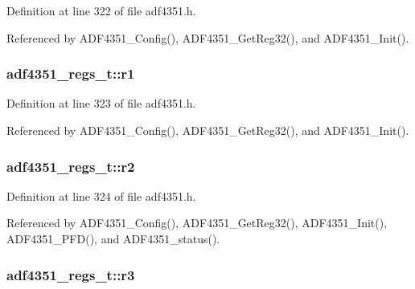 Definition at line 322 of file adf4351.\+h.



Referenced by A\+D\+F4351\+\_\+\+Config(), A\+D\+F4351\+\_\+\+Get\+Reg32(), and A\+D\+F4351\+\_\+\+Init().

\subsubsection[{\texorpdfstring{r1}{r1}}]{ adf4351\+\_\+regs\+\_\+t\+::r1}\hypertarget{structadf4351__regs__t_a9e35aa252797cdae6d46ae0daad2bc40}{}\label{structadf4351__regs__t_a9e35aa252797cdae6d46ae0daad2bc40}


Definition at line 323 of file adf4351.\+h.



Referenced by A\+D\+F4351\+\_\+\+Config(), A\+D\+F4351\+\_\+\+Get\+Reg32(), and A\+D\+F4351\+\_\+\+Init().

\subsubsection[{\texorpdfstring{r2}{r2}}]{ adf4351\+\_\+regs\+\_\+t\+::r2}\hypertarget{structadf4351__regs__t_af6667dbbd7434e0394cc9f569d3e24bb}{}\label{structadf4351__regs__t_af6667dbbd7434e0394cc9f569d3e24bb}


Definition at line 324 of file adf4351.\+h.



Referenced by A\+D\+F4351\+\_\+\+Config(), A\+D\+F4351\+\_\+\+Get\+Reg32(), A\+D\+F4351\+\_\+\+Init(), A\+D\+F4351\+\_\+\+P\+F\+D(), and A\+D\+F4351\+\_\+status().

\subsubsection[{\texorpdfstring{r3}{r3}}]{ adf4351\+\_\+regs\+\_\+t\+::r3}\hypertarget{structadf4351__regs__t_a1aa968491b1182f3ae4f426ef5c1b83a}{}\label{structadf4351__regs__t_a1aa968491b1182f3ae4f426ef5c1b83a}



